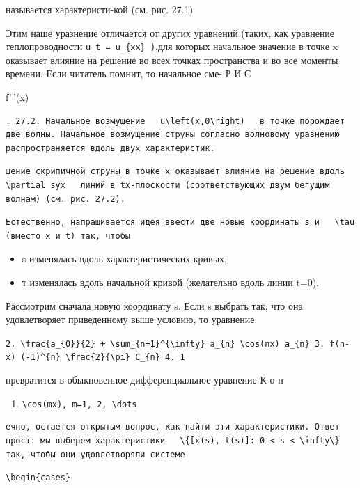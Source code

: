 \documentclass[
  ukrainian,
]{article}
\providecommand{\tightlist}{%
  \setlength{\itemsep}{0pt}\setlength{\parskip}{0pt}}
\begin{document}
называется характеристи-кой (см. рис. 27.1)

Этим наше уразнение отличается от других уравнений (таких, как уравнение
теплопроводности \texttt{u\_t\ =\ u\_\{xx\}\ )},для которых начальное
значение в точке x оказывает влияние на решение во всех точках
пространства и во все моменты времени. Если читатель помнит, то
начальное сме- Р И С

f'\,'(x)

\begin{verbatim}
. 27.2. Начальное возмущение   u\left(x,0\right)   в точке порождает две волны. Начальное возмущение струны согласно волновому уравнению распространяется вдоль двух характеристик.
\end{verbatim}

\begin{verbatim}
щение скрипичной струны в точке x оказывает влияние на решение вдоль   \partial syx   линий в tx-плоскости (соответствующих двум бегущим волнам) (см. рис. 27.2).
\end{verbatim}

\begin{verbatim}
Естественно, напрашивается идея ввести две новые координаты s и   \tau   (вместо x и t) так, чтобы
\end{verbatim}

\begin{itemize}
\item
  s изменялась вдоль характеристических кривых,
\item
  т изменялась вдоль начальной кривой (желательно вдоль линии t=0).
\end{itemize}

Рассмотрим сначала новую координату s. Если s выбрать так, что она
удовлетворяет приведенному выше условию, то уравнение

\texttt{2.\ \textquotesingle{}\textbackslash{}frac\{a\_\{0\}\}\{2\}\ +\ \textbackslash{}sum\_\{n=1\}\^{}\{\textbackslash{}infty\}\ a\_\{n\}\ \textbackslash{}cos(nx)\textquotesingle{}\ \textquotesingle{}a\_\{n\}\textquotesingle{}\ 3.\ \textquotesingle{}f(n-x)\textquotesingle{}\ \textquotesingle{}(-1)\^{}\{n\}\ \textbackslash{}frac\{2\}\{\textbackslash{}pi\}\ C\_\{n\}\textquotesingle{}\ 4.\ 1}

превратится в обыкновенное дифференциальное уравнение К о н

\begin{enumerate}
\def\labelenumi{\arabic{enumi}.}
\setcounter{enumi}{4}
\tightlist
\item
  \texttt{\textbackslash{}cos(mx),\ m=1,\ 2,\ \textbackslash{}dots}
\end{enumerate}

\begin{verbatim}
ечно, остается открытым вопрос, как найти эти характеристики. Ответ прост: мы выберем характеристики   \{[x(s), t(s)]: 0 < s < \infty\}   так, чтобы они удовлетворяли системе
\end{verbatim}

\begin{verbatim}
\begin{cases}
\end{verbatim}
\end{document}
